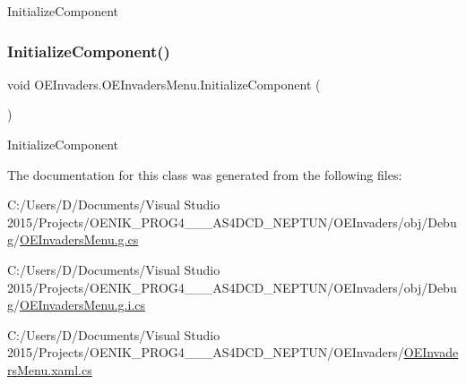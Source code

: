 Initialize\+Component 

\mbox{\label{class_o_e_invaders_1_1_o_e_invaders_menu_ac37b8a5769d575b798377414a4836960}} 
\subsubsection{\texorpdfstring{InitializeComponent()}{InitializeComponent()}\hspace{0.1cm}{\footnotesize\ttfamily [2/2]}}
{\footnotesize\ttfamily void O\+E\+Invaders.\+O\+E\+Invaders\+Menu.\+Initialize\+Component (\begin{DoxyParamCaption}{ }\end{DoxyParamCaption})}



Initialize\+Component 



The documentation for this class was generated from the following files\+:\begin{DoxyCompactItemize}
\item 
C\+:/\+Users/\+D/\+Documents/\+Visual Studio 2015/\+Projects/\+O\+E\+N\+I\+K\+\_\+\+P\+R\+O\+G4\+\_\+\_\+\_\+\+A\+S4\+D\+C\+D\+\_\+\+N\+E\+P\+T\+U\+N/\+O\+E\+Invaders/obj/\+Debug/\mbox{\hyperlink{_debug_2_o_e_invaders_menu_8g_8cs}{O\+E\+Invaders\+Menu.\+g.\+cs}}\item 
C\+:/\+Users/\+D/\+Documents/\+Visual Studio 2015/\+Projects/\+O\+E\+N\+I\+K\+\_\+\+P\+R\+O\+G4\+\_\+\_\+\_\+\+A\+S4\+D\+C\+D\+\_\+\+N\+E\+P\+T\+U\+N/\+O\+E\+Invaders/obj/\+Debug/\mbox{\hyperlink{_debug_2_o_e_invaders_menu_8g_8i_8cs}{O\+E\+Invaders\+Menu.\+g.\+i.\+cs}}\item 
C\+:/\+Users/\+D/\+Documents/\+Visual Studio 2015/\+Projects/\+O\+E\+N\+I\+K\+\_\+\+P\+R\+O\+G4\+\_\+\_\+\_\+\+A\+S4\+D\+C\+D\+\_\+\+N\+E\+P\+T\+U\+N/\+O\+E\+Invaders/\mbox{\hyperlink{_o_e_invaders_menu_8xaml_8cs}{O\+E\+Invaders\+Menu.\+xaml.\+cs}}\end{DoxyCompactItemize}
